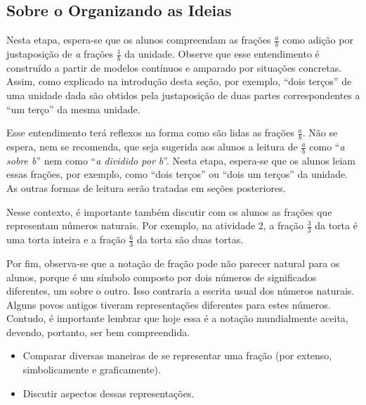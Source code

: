 \subsection{Sobre o Organizando as Ideias}



  Nesta etapa, espera-se que os alunos compreendam as frações   $\frac{a}{b}$ como adição por justaposição de   {\it a}   frações   $\frac{1}{b}$ da unidade. Observe que esse entendimento é construído a partir de modelos contínuos e amparado por situações concretas. Assim, como explicado na introdução desta seção, por exemplo,   ``dois terços'' de uma unidade dada são obtidos pela justaposição de duas partes correspondentes a   ``um terço'' da mesma unidade.

  Esse entendimento terá reflexos na forma como são lidas as frações   $\frac{a}{b}$. Não se espera, nem se recomenda, que seja sugerida aos alunos a leitura de   $\frac{a}{b}$ como   ``{\it a sobre b}'' nem como   ``{\it a dividido por b}''. Nesta etapa, espera-se que os alunos leiam essas frações, por exemplo, como   ``dois terços'' ou   ``dois um terços'' da unidade. As outras formas de leitura serão tratadas em seções posteriores.

  Nesse contexto, é importante também discutir com os alunos as frações que representam números naturais. Por exemplo, na atividade 2, a fração   $\frac{3}{3}$ da torta é uma torta inteira e a fração   $\frac{6}{3}$ da torta são duas tortas.

  Por fim, observa-se que a notação de fração pode não parecer natural para os alunos, porque é um símbolo composto por dois números de significados diferentes, um sobre o outro. Isso contraria a escrita usual dos números naturais. Alguns povos antigos tiveram representações diferentes para estes números.  Contudo, é importante lembrar que hoje essa é a notação mundialmente aceita, devendo, portanto, ser bem compreendida.

\Bg

\begin{objetivos}{}{}
  \begin{itemize} %
    \item       Comparar diversas maneiras de se representar uma fração (por extenso, simbolicamente e graficamente).
    \item       Discutir aspectos dessas representações.
\end{itemize} %

\end{objetivos}

